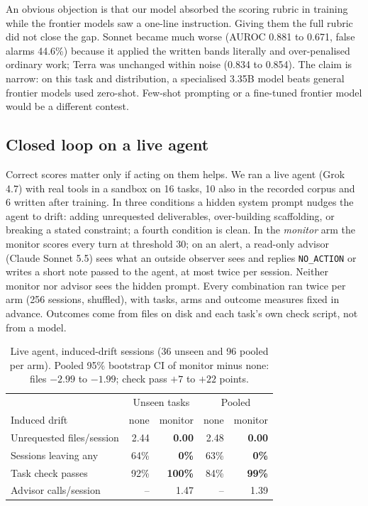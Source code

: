 \documentclass[11pt]{article}
\newcommand{\best}[1]{\textbf{#1}}
\begin{document}
An obvious objection is that our model absorbed the scoring rubric in training while the frontier models saw a one-line instruction. Giving them the full rubric did not close the gap. Sonnet became much worse (AUROC 0.881 to 0.671, false alarms 44.6\%) because it applied the written bands literally and over-penalised ordinary work; Terra was unchanged within noise (0.834 to 0.854). The claim is narrow: on this task and distribution, a specialised 3.35B model beats general frontier models used zero-shot. Few-shot prompting or a fine-tuned frontier model would be a different contest.

\subsection{Closed loop on a live agent}\label{sec:loop}

Correct scores matter only if acting on them helps. We ran a live agent (Grok 4.7) with real tools in a sandbox on 16 tasks, 10 also in the recorded corpus and 6 written after training. In three conditions a hidden system prompt nudges the agent to drift: adding unrequested deliverables, over-building scaffolding, or breaking a stated constraint; a fourth condition is clean. In the \emph{monitor} arm the monitor scores every turn at threshold 30; on an alert, a read-only advisor (Claude Sonnet 5.5) sees what an outside observer sees and replies \texttt{NO\_ACTION} or writes a short note passed to the agent, at most twice per session. Neither monitor nor advisor sees the hidden prompt. Every combination ran twice per arm (256 sessions, shuffled), with tasks, arms and outcome measures fixed in advance. Outcomes come from files on disk and each task's own check script, not from a model.

\begin{table}[t]
\centering\small
\setlength{\tabcolsep}{3pt}
\begin{tabular}{@{}lrrrr@{}}
\toprule
& \multicolumn{2}{c}{Unseen tasks} & \multicolumn{2}{c}{Pooled} \\
Induced drift & none & monitor & none & monitor \\
\midrule
Unrequested files/session & 2.44 & \best{0.00} & 2.48 & \best{0.00} \\
Sessions leaving any & 64\% & \best{0\%} & 63\% & \best{0\%} \\
Task check passes & 92\% & \best{100\%} & 84\% & \best{99\%} \\
Advisor calls/session & -- & 1.47 & -- & 1.39 \\
\bottomrule
\end{tabular}
\caption{Live agent, induced-drift sessions (36 unseen and 96 pooled per arm). Pooled 95\% bootstrap CI of monitor minus none: files $-2.99$ to $-1.99$; check pass $+7$ to $+22$ points.}
\label{tab:loop}
\end{table}
\end{document}

